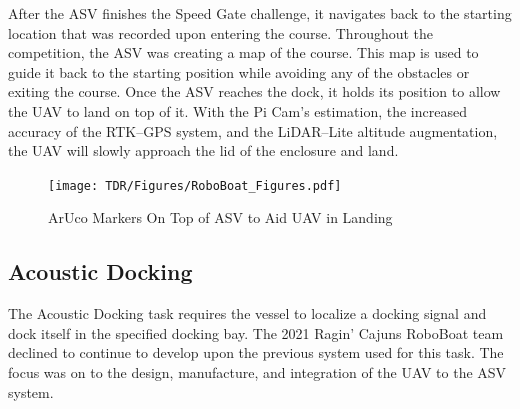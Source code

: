 \documentclass[letterpaper, 12 pt, conference]{ieeeconf}
\begin{document}
After the ASV finishes the Speed Gate challenge, it navigates back to the starting location that was recorded upon entering the course. Throughout the competition, the ASV was creating a map of the course. This map is used to guide it back to the starting position while avoiding any of the obstacles or exiting the course. Once the ASV reaches the dock, it holds its position to allow the UAV to land on top of it. With the Pi Cam's estimation, the increased accuracy of the RTK--GPS system, and the LiDAR--Lite altitude augmentation, the UAV will slowly approach the lid of the enclosure and land.



%
\begin{figure}[tb]
\vspace{0.05in}
\centering
\texttt{[image: TDR/Figures/RoboBoat\_Figures.pdf]}
\caption{ArUco Markers On Top of ASV to Aid UAV in Landing}
\label{fig:aruco}
\end{figure}
%
\subsection{Acoustic Docking}
% 
The Acoustic Docking task requires the vessel to localize a docking signal and dock itself in the specified docking bay. The 2021 Ragin' Cajuns RoboBoat team declined to continue to develop upon the previous system used for this task. The focus was on to the design, manufacture, and integration of the UAV to the ASV system.
% 
\end{document}
